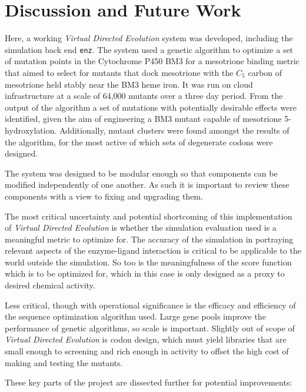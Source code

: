 \documentclass[16pt]{book}
\begin{document}
\section{Discussion and Future Work}

Here, a working \textit{Virtual Directed Evolution} system was developed, including the simulation back end \texttt{enz}.
The system used a genetic algorithm to optimize a set of mutation points in the Cytochrome P450 BM3 for a mesotrione binding metric that aimed to select for mutants that dock mesotrione with the $C_5$ carbon of mesotrione held stably near the BM3 heme iron.
It was run on cloud infrastructure at a scale of 64,000 mutants over a three day period.
From the output of the algorithm a set of mutations with potentially desirable effects were identified, given the aim of engineering a BM3 mutant capable of mesotrione 5-hydroxylation.
Additionally, mutant clusters were found amongst the results of the algorithm, for the most active of which sets of degenerate codons were designed.

The system was designed to be modular enough so that components can be modified independently of one another.
As such it is important to review these components with a view to fixing and upgrading them.

The most critical uncertainty and potential shortcoming of this implementation of \textit{Virtual Directed Evolution} is whether the simulation evaluation used is a meaningful metric to optimize for.
The accuracy of the simulation in portraying relevant aspects of the enzyme-ligand interaction is critical to be applicable to the world outside the simulation.
So too is the meaningfulness of the score function which is to be optimized for, which in this case is only designed as a proxy to desired chemical activity.

Less critical, though with operational significance is the efficacy and efficiency of the sequence optimization algorithm used.
Large gene pools improve the performance of genetic algorithms, so scale is important.
Slightly out of scope of \textit{Virtual Directed Evolution} is codon design, which must yield libraries that are small enough to screening and rich enough in activity to offset the high cost of making and testing the mutants.

These key parts of the project are dissected further for potential improvements:
\end{document}
